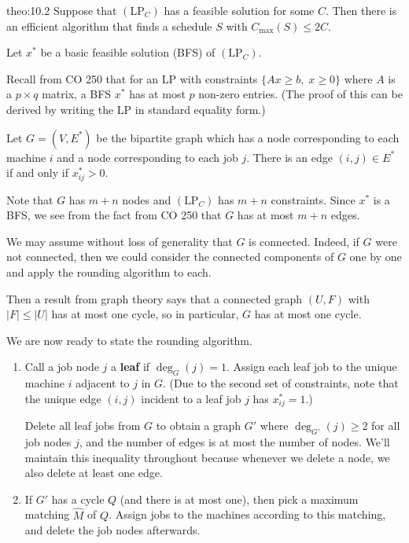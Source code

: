 \begin{theo}{theo:10.2}
    Suppose that $(\text{LP}_C)$ has a feasible solution for some $C$.
    Then there is an efficient algorithm that finds a schedule $S$ 
    with $C_{\max}(S) \leq 2C$. 
\end{theo}
\begin{pf}
    Let $x^*$ be a basic feasible solution (BFS) of $(\text{LP}_C)$. 

    Recall from CO 250 that for an LP with constraints $\{Ax \geq b,\; 
    x \geq 0\}$ where $A$ is a $p \times q$ matrix, a BFS $x^*$ has at most 
    $p$ non-zero entries. (The proof of this can be derived by writing 
    the LP in standard equality form.)

    Let $G = (V, E^*)$ be the bipartite graph which has a node corresponding 
    to each machine $i$ and a node corresponding to each job $j$. 
    There is an edge $(i, j) \in E^*$ if and only if $x_{ij}^* > 0$. 

    Note that $G$ has $m + n$ nodes and $(\text{LP}_C)$ has $m + n$ 
    constraints. Since $x^*$ is a BFS, we see from the fact from CO 250 
    that $G$ has at most $m + n$ edges. 

    We may assume without loss of generality that $G$ is connected. 
    Indeed, if $G$ were not connected, then we could consider the connected 
    components of $G$ one by one and apply the rounding algorithm to each. 

    Then a result from graph theory says that a connected graph $(U, F)$ 
    with $|F| \leq |U|$ has at most one cycle, so in particular, $G$ 
    has at most one cycle. 

    We are now ready to state the rounding algorithm. 
    \begin{enumerate}
        \item Call a job node $j$ a {\bf leaf} if $\deg_G(j) = 1$. 
        Assign each leaf job to the unique machine $i$ adjacent to $j$ 
        in $G$. (Due to the second set of constraints, note that the unique edge 
        $(i, j)$ incident to a leaf job $j$ has $x_{ij}^* = 1$.) 
        
        Delete all leaf jobs from $G$ to obtain a graph $G'$ where $\deg_{G'}(j) \geq 2$ 
        for all job nodes $j$, and the number of edges is at most the number of 
        nodes. We'll maintain this inequality throughout because whenever 
        we delete a node, we also delete at least one edge. 

        \item If $G'$ has a cycle $Q$ (and there is at most one), then pick a 
        maximum matching $\hat M$ of $Q$. Assign jobs to the machines according 
        to this matching, and delete the job nodes afterwards. 


\end{enumerate}
\end{pf}
